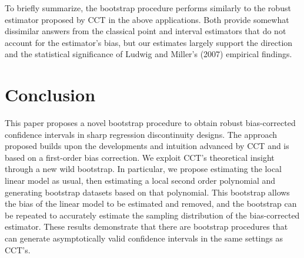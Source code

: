 \documentclass[12pt,fleqn]{article}
\begin{document}
To briefly summarize, the bootstrap procedure performs similarly to the robust
estimator proposed by CCT in the above applications. Both provide somewhat
dissimilar answers from the classical point and interval estimators that do
not account for the estimator's bias, but our estimates largely support the
direction and the statistical significance of Ludwig and Miller's (2007)
empirical findings.

\section{Conclusion}\label{conclusion}

This paper proposes a novel bootstrap procedure to obtain robust bias-corrected
confidence intervals in sharp regression discontinuity designs. The approach proposed builds upon the developments and intuition
advanced by CCT and is based on a first-order bias correction. We exploit CCT's
theoretical insight through a new wild bootstrap. In particular, we propose
estimating the local linear model as usual, then estimating a local second order
polynomial and generating bootstrap datasets based on that
polynomial. This bootstrap allows the bias of the linear model to be estimated
and removed, and the bootstrap can be repeated to accurately estimate the
sampling distribution of the bias-corrected estimator. These results demonstrate
that there are bootstrap procedures that can generate asymptotically valid
confidence intervals in the same settings as CCT's.

\appendix
\end{document}
